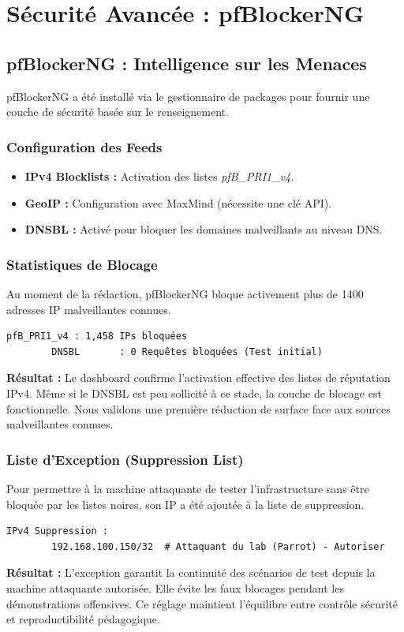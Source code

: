 \documentclass[12pt,a4paper,openany]{report}
\begin{document}
	\section{Sécurité Avancée : pfBlockerNG}
	
	\subsection{pfBlockerNG : Intelligence sur les Menaces}
	pfBlockerNG a été installé via le gestionnaire de packages pour fournir une couche de sécurité basée sur le renseignement.
	
	\subsubsection{Configuration des Feeds}
	\begin{itemize}
		\item \textbf{IPv4 Blocklists :} Activation des listes \textit{pfB\_PRI1\_v4}.
		\item \textbf{GeoIP :} Configuration avec MaxMind (nécessite une clé API).
		\item \textbf{DNSBL :} Activé pour bloquer les domaines malveillants au niveau DNS.
	\end{itemize}
	
	\subsubsection{Statistiques de Blocage}
	Au moment de la rédaction, pfBlockerNG bloque activement plus de 1400 adresses IP malveillantes connues.
	\begin{lstlisting}[caption=Statut pfBlockerNG Dashboard]
		pfB_PRI1_v4 : 1,458 IPs bloquées
		DNSBL       : 0 Requêtes bloquées (Test initial)
	\end{lstlisting}
	\textbf{Résultat :} Le dashboard confirme l’activation effective des listes de réputation IPv4. Même si le DNSBL est peu sollicité à ce stade, la couche de blocage est fonctionnelle. Nous validons une première réduction de surface face aux sources malveillantes connues.
	
	\subsubsection{Liste d'Exception (Suppression List)}
	Pour permettre à la machine attaquante de tester l'infrastructure sans être bloquée par les listes noires, son IP a été ajoutée à la liste de suppression.
	\begin{lstlisting}[caption=Configuration Suppression List]
		IPv4 Suppression :
		192.168.100.150/32  # Attaquant du lab (Parrot) - Autoriser
	\end{lstlisting}
	\textbf{Résultat :} L’exception garantit la continuité des scénarios de test depuis la machine attaquante autorisée. Elle évite les faux blocages pendant les démonstrations offensives. Ce réglage maintient l’équilibre entre contrôle sécurité et reproductibilité pédagogique.
	
\end{document}

